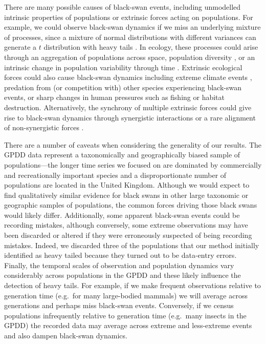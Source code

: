 \documentclass[9pt,twocolumn,twoside]{pnas-new}
\begin{document}
There are many possible causes of black-swan events, including
unmodelled intrinsic properties of populations or extrinsic forces acting on
populations. For example, we could observe black-swan dynamics if we miss an
underlying mixture of processes, since a mixture of normal distributions with
different variances can generate a $t$ distribution with heavy
tails \cite{gelman2014}. In ecology, these processes could arise through an
aggregation of populations across space, population
diversity \cite{schindler2010}, or an intrinsic change in population variability
through time \cite{carpenter2006}. Extrinsic ecological forces could also cause
black-swan dynamics \cite{nunez2012} including extreme climate
events \cite{meehl2004, katz2005, ipcc2012}, predation from (or competition
with) other species experiencing black-swan events, or sharp changes in human
pressures such as fishing or habitat destruction. Alternatively, the
synchrony of multiple extrinsic forces could give rise to black-swan dynamics
through synergistic interactions \cite{kirby2009} or a rare alignment of
non-synergistic forces \cite{denny2009}.

There are a number of caveats when considering the generality of our results.
The GPDD data represent a taxonomically and geographically biased sample of
populations---the longer time series we focused on are dominated by commercially
and recreationally important species and a disproportionate number of
populations are located in the United Kingdom. Although we would expect to find
qualitatively similar evidence for black swans in other large taxonomic or
geographic samples of populations, the common forces driving those black swans
would likely differ. Additionally, some apparent black-swan events could be
recording mistakes, although conversely, some extreme observations may have been
discarded or altered if they were erroneously suspected of being recording
mistakes. Indeed, we discarded three of the populations that our method
initially identified as heavy tailed because they turned out to be data-entry
errors. Finally, the temporal scales of observation and population dynamics
vary considerably across populations in the GPDD and these likely influence the
detection of heavy tails. For example, if we make frequent observations
relative to generation time (e.g.~for many large-bodied mammals) we will
average across generations and perhaps miss black-swan events. Conversely, if
we census populations infrequently relative to generation time (e.g.~many
insects in the GPDD) the recorded data may average across extreme and
less-extreme events and also dampen black-swan dynamics.
\end{document}
